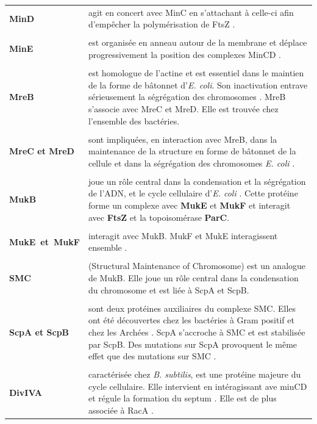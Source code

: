 \begin{longtable}{@{\hspace{-2cm}\hspace{1cm}} >{\bfseries}p{} | >{\small}p{}}
	\\[-0.2cm]
	 MinD & agit en concert avec MinC en s'attachant à celle-ci afin d'empêcher la polymérisation de FtsZ \citep{thanbichler2010}. \\
	\\[-0.2cm]
	 MinE & est organisée en anneau autour de la membrane et déplace progressivement la position des complexes MinCD \citep{thanbichler2010}. \\
	\\[-0.2cm]
	 MreB & est homologue de l'actine et est essentiel dans le maintien de la forme de bâtonnet d'\textit{E. coli}. Son inactivation entrave sérieusement la ségrégation des chromosomes \citep{Ebersbach2005}. MreB s'associe avec MreC et MreD. Elle est trouvée chez l'ensemble des bactéries.\\
	 \\[-0.2cm]
	 MreC et MreD & sont impliquées, en interaction avec MreB, dans la maintenance de la structure en forme de bâtonnet de la cellule et dans la ségrégation des chromosomes \textit{E. coli} \citep{wachi1989new}.\\
	\\[-0.2cm]
	MukB & joue un rôle central dans la condensation et la ségrégation de l'ADN, et le cycle cellulaire d'\textit{E. coli} \citep{thanbichler2010,yamanaka1996identification}. Cette protéine forme un complexe avec \textbf{MukE} et \textbf{MukF} et interagit avec \textbf{FtsZ} et la topoisomérase \textbf{ParC}.\\
	\\[-0.2cm]
	\mbox{MukE et MukF} & interagit avec MukB. MukF et MukE interagissent ensemble \citep{yamanaka1996identification}. \\
	\\[-0.2cm]
	 SMC & (Structural Maintenance of Chromosome) est un analogue de MukB. Elle joue un rôle central dans la condensation du chromosome et est liée à ScpA et ScpB.\\
	\\[-0.2cm]
	 ScpA et ScpB & sont deux protéines auxiliaires du complexe SMC. Elles ont été découvertes chez les bactéries à Gram positif et chez les Archées \citep{thanbichler2010}. ScpA s'accroche à SMC et est stabilisée par ScpB. Des mutations sur ScpA provoquent le même effet que des mutations sur SMC \citep{thanbichler2010}.\\
	\\[-0.2cm]
	  DivIVA & caractérisée chez \textit{B. subtilis}, est une protéine majeure du cycle cellulaire. Elle intervient en intéragissant ave minCD et régule la formation du septum \citep{edwards1997bacillus}. Elle est de plus associée à RacA \citep{OSullivan2011}.\\

\end{longtable}
